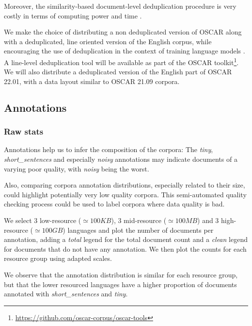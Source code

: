 Moreover, the similarity-based document-level deduplication procedure is very costly in terms of computing power and time \cite{gao-etal-2020-pile}.

We make the choice of distributing a non deduplicated version of OSCAR along with a deduplicated, line oriented version of the English corpus, while encouraging the use of deduplication in the context of training language models \cite{lee-etal-2021-deduplicating}.
A line-level deduplication tool will be available as part of the OSCAR toolkit\footnote{\url{https://github.com/oscar-corpus/oscar-tools}}. We will also distribute a deduplicated version of the English part of OSCAR 22.01, with a data layout similar to OSCAR 21.09 corpora.


\subsection{Annotations}

\subsubsection{Raw stats}

Annotations help us to infer the composition of the corpora: The \textit{tiny}, \textit{short\_sentences} and especially \textit{noisy} annotations may indicate documents of a varying poor quality, with \textit{noisy} being the worst.

Also, comparing corpora annotation distributions, especially related to their size, could highlight potentially very low quality corpora. This semi-automated quality checking process could be used to label corpora where data quality is bad.

We select 3 low-resource ($\simeq100KB$), 3 mid-resource ($\simeq100MB$) and 3 high-resource ($\simeq100GB$) languages and plot the number of documents per annotation, adding a \textit{total} legend for the total document count and a \textit{clean} legend for documents that do not have any annotation. We then plot the counts for each resource group using adapted scales.

We observe that the annotation distribution is similar for each resource group, but that the lower resourced languages have a higher proportion of documents annotated with \textit{short\_sentences} and \textit{tiny}.

